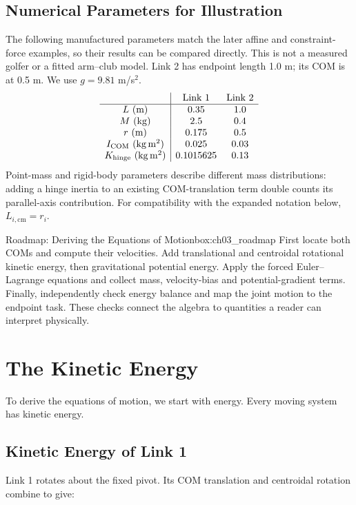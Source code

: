 \subsection*{Numerical Parameters for Illustration}
The following manufactured parameters match the later affine and constraint-force examples, so their results can be compared directly. This is not a measured golfer or a fitted arm--club model. Link 2 has endpoint length 1.0 m; its COM is at 0.5 m. We use $g=9.81$ m/s$^2$.
\[
\begin{array}{c|cc}
 &\text{Link 1}&\text{Link 2}\\\hline
L\ (\mathrm m)&0.35&1.0\\
M\ (\mathrm{kg})&2.5&0.4\\
r\ (\mathrm m)&0.175&0.5\\
I_{\rm COM}\ (\mathrm{kg\,m^2})&0.025&0.03\\
K_{\rm hinge}\ (\mathrm{kg\,m^2})&0.1015625&0.13
\end{array}
\]
Point-mass and rigid-body parameters describe different mass distributions: adding a hinge inertia to an existing COM-translation term double counts its parallel-axis contribution. For compatibility with the expanded notation below, $L_{i,\mathrm{cm}}=r_i$.

\begin{laymansbox}{Roadmap: Deriving the Equations of Motion}{box:ch03_roadmap}
First locate both COMs and compute their velocities. Add translational and centroidal rotational kinetic energy, then gravitational potential energy. Apply the forced Euler--Lagrange equations and collect mass, velocity-bias and potential-gradient terms. Finally, independently check energy balance and map the joint motion to the endpoint task. These checks connect the algebra to quantities a reader can interpret physically.
\end{laymansbox}

\section{The Kinetic Energy}

To derive the equations of motion, we start with energy. Every moving system has kinetic energy.

\subsection*{Kinetic Energy of Link 1}

Link 1 rotates about the fixed pivot. Its COM translation and centroidal rotation combine to give:

